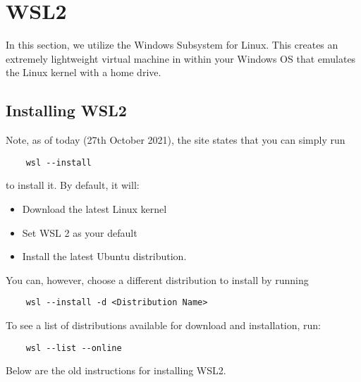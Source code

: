 \chapter{WSL2} \label{ChapWSL2}

In this section, we utilize the Windows Subsystem for Linux. This creates an
extremely lightweight virtual machine in within your Windows OS that emulates
the Linux kernel with a home drive.

\section{Installing WSL2}
Note, as of today (27th October 2021), the site \cite{microsoft2021wsl} states
that you can simply run
\begin{lstlisting}
    wsl --install
\end{lstlisting}
to install it. By default, it will:
\begin{itemize}
    \item Download the latest Linux kernel
    \item Set WSL 2 as your default
    \item Install the latest Ubuntu distribution.
\end{itemize}
You can, however, choose a different distribution to install by running
\begin{lstlisting}
    wsl --install -d <Distribution Name>
\end{lstlisting}
To see a list of distributions available for download and installation, run:
\begin{lstlisting}
    wsl --list --online
\end{lstlisting}
Below are the old instructions for installing WSL2.\\

